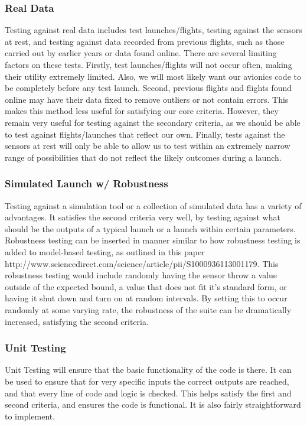 \documentclass[onecolumn, draftclsnofoot,10pt, compsoc]{IEEEtran}
\begin{document}
\subsubsection{Real Data}
Testing against real data includes test launches/flights, testing against the sensors at rest, and testing against data recorded from previous flights, such as those carried out by earlier years or data found online. There are several limiting factors on these tests. Firstly, test launches/flights will not occur often, making their utility extremely limited. Also, we will most likely want our avionics code to be completely before any test launch. Second, previous flights and flights found online may have their data fixed to remove outliers or not contain errors. This makes this method less useful for satisfying our core criteria. However, they remain very useful for testing against the secondary criteria, as we should be able to test against flights/launches that reflect our own. Finally, tests against the sensors at rest will only be able to allow us to test within an extremely narrow range of possibilities that do not reflect the likely outcomes during a launch.
\subsubsection{Simulated Launch w/ Robustness}
Testing against a simulation tool or a collection of simulated data has a variety of advantages. It satisfies the second criteria very well, by testing against what should be the outputs of a typical launch or a launch within certain parameters. Robustness testing can be inserted in manner similar to how robustness testing is added to model-based testing, as outlined in this paper http://www.sciencedirect.com/science/article/pii/S1000936113001179. This robustness testing would include randomly having the sensor throw a value outside of the expected bound, a value that does not fit it's standard form, or having it shut down and turn on at random intervals. By setting this to occur randomly at some varying rate, the robustness of the suite can be dramatically increased, satisfying the second criteria.
\subsubsection{Unit Testing}
Unit Testing will ensure that the basic functionality of the code is there. It can be used to ensure that for very specific inputs the correct outputs are reached, and that every line of code and logic is checked. This helps satisfy the first and second criteria, and ensures the code is functional. It is also fairly straightforward to implement.
\end{document}

